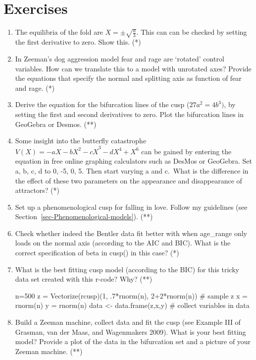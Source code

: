 \documentclass[
  a4paper,
  DIV=11,
  numbers=noendperiod,
  oneside]{scrreprt}
\newenvironment{Shaded}{\begin{snugshade}}{\end{snugshade}}
\newcommand{\CommentTok}[1]{\textcolor[rgb]{0.37,0.37,0.37}{#1}}
\newcommand{\DecValTok}[1]{\textcolor[rgb]{0.68,0.00,0.00}{#1}}
\newcommand{\FunctionTok}[1]{\textcolor[rgb]{0.28,0.35,0.67}{#1}}
\newcommand{\NormalTok}[1]{\textcolor[rgb]{0.00,0.23,0.31}{#1}}
\newcommand{\OtherTok}[1]{\textcolor[rgb]{0.00,0.23,0.31}{#1}}
\newcommand{\SpecialCharTok}[1]{\textcolor[rgb]{0.37,0.37,0.37}{#1}}
\begin{document}
\hypertarget{sec-Exercises}{%
\section{Exercises}\label{sec-Exercises}}

\begin{enumerate}
\def\labelenumi{\arabic{enumi})}
\item
  The equilibria of the fold are \(X = \pm \sqrt{\frac{a}{3}}\). This
  can can be checked by setting the first derivative to zero. Show this.
  (*)
\item
  In Zeeman's dog aggression model fear and rage are `rotated' control
  variables. How can we translate this to a model with unrotated axes?
  Provide the equations that specify the normal and splitting axis as
  function of fear and rage. (*)
\item
  Derive the equation for the bifurcation lines of the cusp
  (\(27a^{2} = 4b^{3})\), by setting the first and second derivatives to
  zero. Plot the bifurcation lines in GeoGebra or Desmos. (**)
\item
  Some insight into the butterfly catastrophe
  \(V(X) = {- aX - bX^{2} - cX}^{3} - dX^{4} + X^{6}\) can be gained by
  entering the equation in free online graphing calculators such as
  DesMos or GeoGebra. Set a, b, c, d to 0, -5, 0, 5. Then start varying
  a and c.~What is the difference in the effect of these two parameters
  on the appearance and disappearance of attractors? (*)
\item
  Set up a phenomenological cusp for falling in love. Follow my
  guidelines (see Section~\ref{sec-Phenomenological-models}). (**)
\item
  Check whether indeed the Bentler data fit better with when age\_range
  only loads on the normal axis (according to the AIC and BIC). What is
  the correct specification of beta in cusp() in this case? (*)
\item
  What is the best fitting cusp model (according to the BIC) for this
  tricky data set created with this r-code? Why? (**)

\begin{Shaded}
\begin{Highlighting}[]
\NormalTok{n}\OtherTok{=}\DecValTok{500}
\NormalTok{z }\OtherTok{=} \FunctionTok{Vectorize}\NormalTok{(rcusp)(}\DecValTok{1}\NormalTok{, .}\DecValTok{7}\SpecialCharTok{*}\FunctionTok{rnorm}\NormalTok{(n), }\DecValTok{2}\SpecialCharTok{+}\DecValTok{2}\SpecialCharTok{*}\FunctionTok{rnorm}\NormalTok{(n)) }\CommentTok{\# sample z }
\NormalTok{x }\OtherTok{=} \FunctionTok{rnorm}\NormalTok{(n) }
\NormalTok{y }\OtherTok{=} \FunctionTok{rnorm}\NormalTok{(n) }
\NormalTok{data }\OtherTok{\textless{}{-}} \FunctionTok{data.frame}\NormalTok{(z,x,y) }\CommentTok{\# collect variables in data}
\end{Highlighting}
\end{Shaded}
\item
  Build a Zeeman machine, collect data and fit the cusp (see Example III
  of Grasman, van der Maas, and Wagenmakers 2009). What is your best
  fitting model? Provide a plot of the data in the bifurcation set and a
  picture of your Zeeman machine. (**)
\end{enumerate}
\end{document}
